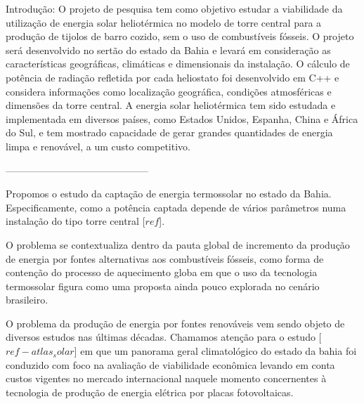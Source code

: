 




Introdução: O projeto de pesquisa tem como objetivo estudar a viabilidade da utilização de energia solar heliotérmica no modelo de torre central para a produção de tijolos de barro cozido, sem o uso de combustíveis fósseis. O projeto será desenvolvido no sertão do estado da Bahia e levará em consideração as características geográficas, climáticas e dimensionais da instalação. O cálculo de potência de radiação refletida por cada heliostato foi desenvolvido em C++ e considera informações como localização geográfica, condições atmosféricas e dimensões da torre central. A energia solar heliotérmica tem sido estudada e implementada em diversos países, como Estados Unidos, Espanha, China e África do Sul, e tem mostrado capacidade de gerar grandes quantidades de energia limpa e renovável, a um custo competitivo.



--------------------------------------------


Propomos o estudo da captação de energia termossolar no estado da Bahia.
Especificamente, como a potência captada depende de vários parâmetros numa
instalação do tipo torre central [$ref$].

O problema se contextualiza dentro da pauta global de incremento da produção de
energia por fontes alternativas aos combustíveis fósseis, como forma de
contenção do processo de aquecimento globa em que o uso da tecnologia
termossolar figura como uma proposta ainda pouco explorada no cenário
brasileiro.

O problema da produção de energia por fontes renováveis vem sendo objeto de
diversos estudos nas últimas décadas. Chamamos atenção para o estudo
[$ref-atlas_solar$] em que um panorama geral climatológico do estado da bahia
foi conduzido com foco na avaliação de viabilidade econômica levando em conta
custos vigentes no mercado internacional naquele momento concernentes à tecnologia 
de produção de energia elétrica por placas fotovoltaicas.

